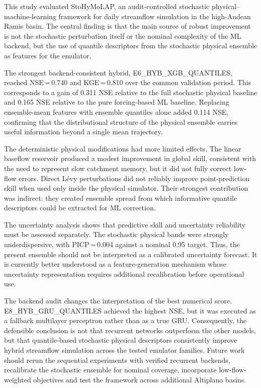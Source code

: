 \documentclass[a4paper,fleqn]{cas-sc}
\begin{document}
This study evaluated StoHyMoLAP, an audit-controlled stochastic
physical--machine-learning framework for daily streamflow simulation in
the high-Andean Ramis basin. The central finding is that the main source
of robust improvement is not the stochastic perturbation itself or the
nominal complexity of the ML backend, but the use of quantile
descriptors from the stochastic physical ensemble as features for the
emulator.

The strongest backend-consistent hybrid, E6\_HYB\_XGB\_QUANTILES,
reached NSE\,=\,0.740 and KGE\,=\,0.810 over the common validation
period. This corresponds to a gain of 0.311 NSE relative to the full
stochastic physical baseline and 0.165 NSE relative to the pure
forcing-based ML baseline. Replacing ensemble-mean features with
ensemble quantiles alone added 0.114 NSE, confirming that the
distributional structure of the physical ensemble carries useful
information beyond a single mean trajectory.

The deterministic physical modifications had more limited effects. The
linear baseflow reservoir produced a modest improvement in global skill,
consistent with the need to represent slow catchment memory, but it did
not fully correct low-flow errors. Direct L\'{e}vy perturbations did not
reliably improve point-prediction skill when used only inside the
physical simulator. Their strongest contribution was indirect: they
created ensemble spread from which informative quantile descriptors
could be extracted for ML correction.

The uncertainty analysis shows that predictive skill and uncertainty
reliability must be assessed separately. The stochastic physical bands
were strongly underdispersive, with PICP\,=\,0.004 against a nominal
0.95 target. Thus, the present ensemble should not be interpreted as a
calibrated uncertainty forecast. It is currently better understood as a
feature-generation mechanism whose uncertainty representation requires
additional recalibration before operational use.

The backend audit changes the interpretation of the best numerical
score. E8\_HYB\_GRU\_QUANTILES achieved the highest NSE, but it was
executed as a fallback multilayer perceptron rather than as a true GRU.
Consequently, the defensible conclusion is not that recurrent networks
outperform the other models, but that quantile-based stochastic
physical descriptors consistently improve hybrid streamflow simulation
across the tested emulator families. Future work should rerun the
sequential experiments with verified recurrent backends, recalibrate the
stochastic ensemble for nominal coverage, incorporate low-flow-weighted
objectives and test the framework across additional Altiplano basins.
\end{document}
